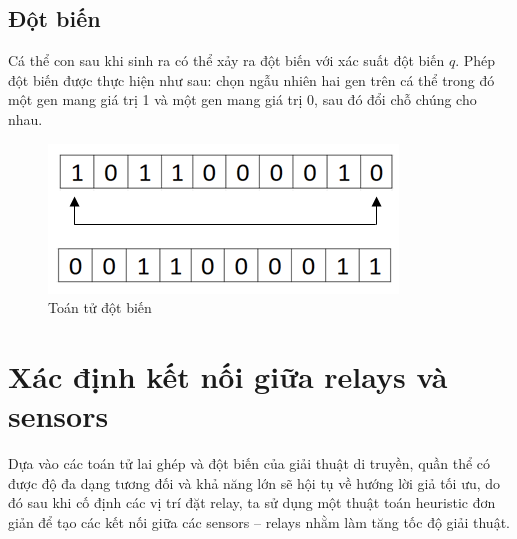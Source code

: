 \subsection{Đột biến }
Cá thể con sau khi sinh ra có thể xảy ra đột biến với xác suất đột biến $q$. Phép đột biến được thực hiện như sau: chọn ngẫu nhiên hai gen trên cá thể trong đó một gen mang giá trị 1 và một gen mang giá trị 0, sau đó đổi chỗ chúng cho nhau.
\begin{figure}[H]
    \centering
    \includegraphics[width=0.6\linewidth]{picture/mutation.png}
    \caption{Toán tử đột biến}
\end{figure}
\section{Xác định kết nối giữa relays và sensors }
Dựa vào các toán tử lai ghép và đột biến của giải thuật di truyền, quần thể có được độ đa dạng tương đối và khả năng lớn sẽ hội tụ về hướng lời giả tối ưu, do đó sau khi cố định các vị trí đặt relay, ta sử dụng một thuật toán heuristic đơn giản để tạo các kết nối giữa các sensors – relays nhằm làm tăng tốc độ giải thuật.

